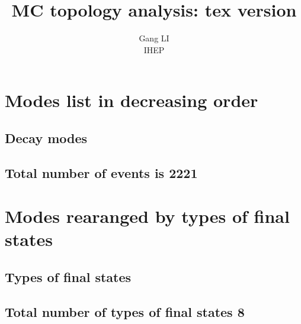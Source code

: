 \documentclass[11pt]{article}
\begin{document}
\title{MC topology analysis: tex version}
\author{Gang LI\\
\small{ IHEP}}
\maketitle

\tableofcontents
\newpage
\section{Modes list in decreasing order}

\subsection{Decay modes }
\begin{landscape}  \end{landscape} \clearpage 
\begin{landscape}  \end{landscape} \clearpage  

\subsection{Total number of events is 2221}

\setcounter{table}{0}

\section{Modes rearanged by types of final states}

\subsection{ Types of final states }
\begin{landscape}  \end{landscape} \clearpage

\subsection{ Total number of types of final states 8}
\end{document}
